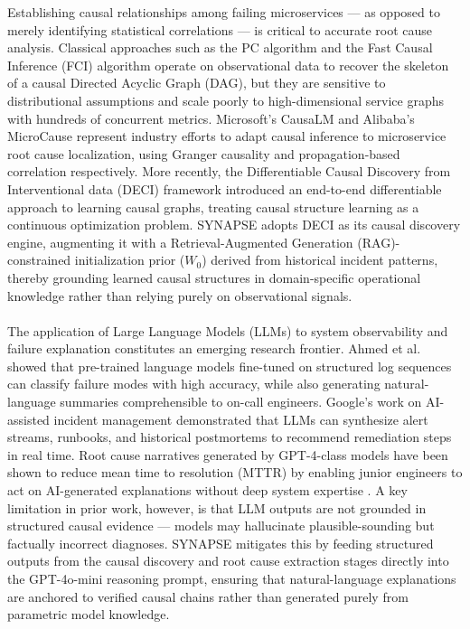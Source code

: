 \hspace*{0.3in} Establishing causal relationships among failing microservices — as opposed to merely identifying statistical correlations — is critical to accurate root cause analysis. Classical approaches such as the PC algorithm \cite{spirtes2000causation} and the Fast Causal Inference (FCI) algorithm operate on observational data to recover the skeleton of a causal Directed Acyclic Graph (DAG), but they are sensitive to distributional assumptions and scale poorly to high-dimensional service graphs with hundreds of concurrent metrics. Microsoft's CausaLM \cite{eberts2022causalm} and Alibaba's MicroCause \cite{wu2021microrca} represent industry efforts to adapt causal inference to microservice root cause localization, using Granger causality and propagation-based correlation respectively. More recently, the Differentiable Causal Discovery from Interventional data (DECI) framework \cite{geffner2022deep} introduced an end-to-end differentiable approach to learning causal graphs, treating causal structure learning as a continuous optimization problem. SYNAPSE adopts DECI as its causal discovery engine, augmenting it with a Retrieval-Augmented Generation (RAG)-constrained initialization prior ($W_0$) derived from historical incident patterns, thereby grounding learned causal structures in domain-specific operational knowledge rather than relying purely on observational signals.\\\\

\hspace*{0.3in} The application of Large Language Models (LLMs) to system observability and failure explanation constitutes an emerging research frontier. Ahmed et al. \cite{ahmed2023log} showed that pre-trained language models fine-tuned on structured log sequences can classify failure modes with high accuracy, while also generating natural-language summaries comprehensible to on-call engineers. Google's work on AI-assisted incident management \cite{google2023incident} demonstrated that LLMs can synthesize alert streams, runbooks, and historical postmortems to recommend remediation steps in real time. Root cause narratives generated by GPT-4-class models have been shown to reduce mean time to resolution (MTTR) by enabling junior engineers to act on AI-generated explanations without deep system expertise \cite{chen2023llm}. A key limitation in prior work, however, is that LLM outputs are not grounded in structured causal evidence — models may hallucinate plausible-sounding but factually incorrect diagnoses. SYNAPSE mitigates this by feeding structured outputs from the causal discovery and root cause extraction stages directly into the GPT-4o-mini reasoning prompt, ensuring that natural-language explanations are anchored to verified causal chains rather than generated purely from parametric model knowledge.\\\\

